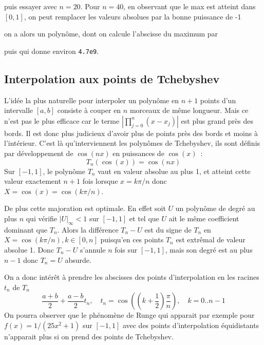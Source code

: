 \documentclass[a4paper,11pt]{article}
\begin{document}
\begin{giacjshere}

puis essayer avec $n=20$. Pour $n=40$, en observant que le max
est atteint dans $[0,1]$, on peut remplacer les valeurs absolues
par la bonne puissance de -1\\

on a alors un polyn\^ome, dont on calcule l'abscisse du maximum par\\

puis  qui donne environ {\tt 4.7e9}.


\subsection{Interpolation aux points de Tchebyshev}
L'id\'ee la plus naturelle pour interpoler un polyn\^ome en $n+1$
points d'un intervalle $[a,b]$ consiste \`a couper en $n$ morceaux
de m\^eme longueur. Mais ce n'est pas le plus efficace car le
terme $|\prod_{j=0}^n(x-x_j)|$ est plus grand pr\`es des bords. Il est
donc plus judicieux d'avoir plus de points pr\`es des bords et moins
\`a l'int\'erieur. C'est l\`a qu'interviennent les polyn\^omes de
Tchebyshev, ils sont d\'efinis par d\'eveloppement de $\cos(nx)$
en puissances de $\cos(x)$~:
$$ T_n(\cos(x))=\cos(nx) $$
Sur $[-1,1]$, le polyn\^ome $T_n$ vaut en valeur absolue au plus 1, et
atteint cette valeur exactement $n+1$ fois lorsque $x=k\pi/n$ donc 
$X=\cos(x)=\cos(k\pi/n)$.\\

De plus cette majoration est optimale. En effet
soit $U$ un polyn\^ome de degr\'e au plus $n$ 
qui v\'erifie $|U|_\infty<1$ sur $[-1,1]$
et tel que $U$ ait le m\^eme coefficient dominant que
$T_n$. Alors la diff\'erence $T_n-U$ est du signe de $T_n$ en
$X=\cos(k\pi/n), k \in [0,n]$ puisqu'en ces points $T_n$ est
extr\^emal de valeur absolue 1. Donc $T_n-U$ s'annule $n$ fois sur
$[-1,1]$, mais son degr\'e est au plus $n-1$ donc $T_n=U$ absurde.

On a donc int\'er\^et \`a prendre les abscisses des points
d'interpolation en les racines $t_n$ de $T_n$
$$ \frac{a+b}{2} + \frac{a-b}{2} t_n, \quad t_n=\cos((k+\frac12)\frac\pi n), 
\quad k=0..n-1$$
On pourra observer que le ph\'enom\`ene de 
Runge qui apparait par
exemple pour $f(x)=1/(25x^2+1)$ sur $[-1,1]$ avec des points d'interpolation
\'equidistants n'apparait plus si on prend des points de Tchebyshev.\\
\\


\end{giacjshere}
\end{document}
